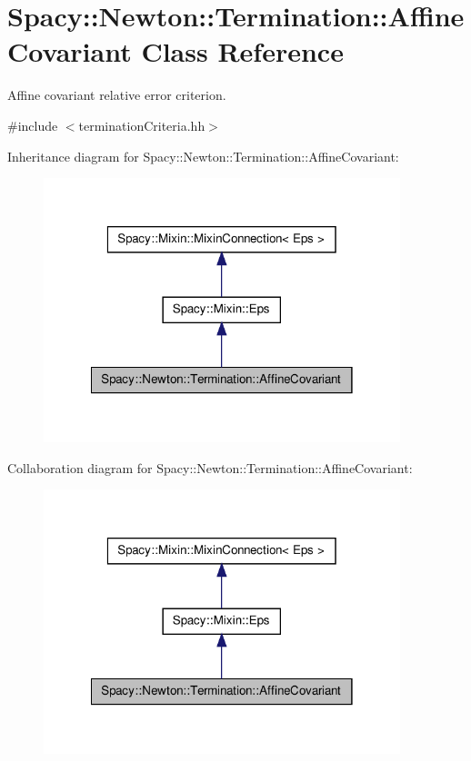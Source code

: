 \hypertarget{classSpacy_1_1Newton_1_1Termination_1_1AffineCovariant}{\section{\-Spacy\-:\-:\-Newton\-:\-:\-Termination\-:\-:\-Affine\-Covariant \-Class \-Reference}
\label{classSpacy_1_1Newton_1_1Termination_1_1AffineCovariant}
}


\-Affine covariant relative error criterion.  




{\ttfamily \#include $<$termination\-Criteria.\-hh$>$}



\-Inheritance diagram for \-Spacy\-:\-:\-Newton\-:\-:\-Termination\-:\-:\-Affine\-Covariant\-:
\nopagebreak
\begin{figure}[H]
\begin{center}
\leavevmode
\includegraphics[width=294pt]{classSpacy_1_1Newton_1_1Termination_1_1AffineCovariant__inherit__graph}
\end{center}
\end{figure}


\-Collaboration diagram for \-Spacy\-:\-:\-Newton\-:\-:\-Termination\-:\-:\-Affine\-Covariant\-:
\nopagebreak
\begin{figure}[H]
\begin{center}
\leavevmode
\includegraphics[width=294pt]{classSpacy_1_1Newton_1_1Termination_1_1AffineCovariant__coll__graph}
\end{center}
\end{figure}
